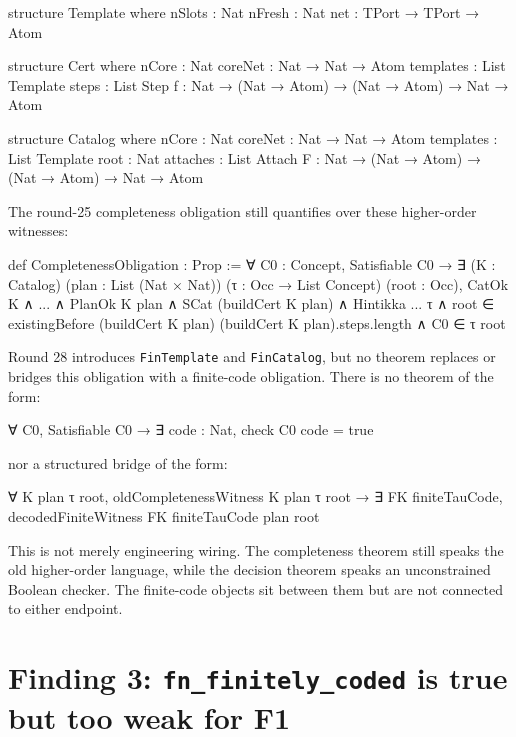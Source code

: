 \documentclass[11pt]{article}
\begin{document}
\begin{leancode}
structure Template where
  nSlots : Nat
  nFresh : Nat
  net : TPort → TPort → Atom

structure Cert where
  nCore : Nat
  coreNet : Nat → Nat → Atom
  templates : List Template
  steps : List Step
  f : Nat → (Nat → Atom) → (Nat → Atom) → Nat → Atom

structure Catalog where
  nCore : Nat
  coreNet : Nat → Nat → Atom
  templates : List Template
  root : Nat
  attaches : List Attach
  F : Nat → (Nat → Atom) → (Nat → Atom) → Nat → Atom
\end{leancode}

The round-25 completeness obligation still quantifies over these higher-order witnesses:

\begin{leancode}
def CompletenessObligation : Prop :=
  ∀ C0 : Concept, Satisfiable C0 →
    ∃ (K : Catalog) (plan : List (Nat × Nat))
      (τ : Occ → List Concept) (root : Occ),
      CatOk K ∧ ... ∧
      PlanOk K plan ∧ SCat (buildCert K plan) ∧
      Hintikka ... τ ∧
      root ∈ existingBefore (buildCert K plan)
        (buildCert K plan).steps.length ∧
      C0 ∈ τ root
\end{leancode}

Round 28 introduces \texttt{FinTemplate} and \texttt{FinCatalog}, but no theorem replaces or bridges this obligation with a finite-code obligation. There is no theorem of the form:

\begin{leancode}
∀ C0, Satisfiable C0 →
  ∃ code : Nat, check C0 code = true
\end{leancode}

nor a structured bridge of the form:

\begin{leancode}
∀ K plan τ root,
  oldCompletenessWitness K plan τ root →
  ∃ FK finiteTauCode,
    decodedFiniteWitness FK finiteTauCode plan root
\end{leancode}

This is not merely engineering wiring. The completeness theorem still speaks the old higher-order language, while the decision theorem speaks an unconstrained Boolean checker. The finite-code objects sit between them but are not connected to either endpoint.

\section{Finding 3: \texttt{fn\_finitely\_coded} is true but too weak for F1}
\end{document}
